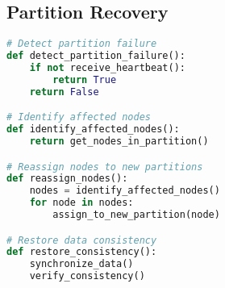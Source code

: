 \subsection{Partition Recovery}
\begin{lstlisting}[language=Python,caption=Partition Recovery]
# Detect partition failure
def detect_partition_failure():
    if not receive_heartbeat():
        return True
    return False

# Identify affected nodes
def identify_affected_nodes():
    return get_nodes_in_partition()

# Reassign nodes to new partitions
def reassign_nodes():
    nodes = identify_affected_nodes()
    for node in nodes:
        assign_to_new_partition(node)

# Restore data consistency
def restore_consistency():
    synchronize_data()
    verify_consistency()
\end{lstlisting} 